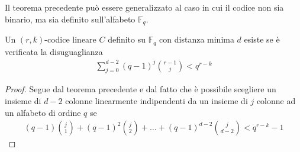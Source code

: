 Il teorema precedente può essere generalizzato al caso in cui il codice non sia binario, ma sia definito sull'alfabeto $\mathbb{F}_{q}$.
\begin{corollario}
   Un $(r,k)$-codice lineare $C$ definito su $\mathbb{F}_{q}$ con distanza minima $d$ esiste se è verificata la disuguaglianza
   \begin{align*}
      \sum_{j=0}^{d-2} (q-1)^{j} \binom{r-1}{j} < q^{r-k}
   \end{align*}
\end{corollario}
\begin{proof}
   Segue dal teorema precedente e dal fatto che è possibile scegliere un insieme di $d-2$ colonne linearmente indipendenti da un insieme di $j$ colonne ad un alfabeto di ordine $q$ se
   \begin{align*}
      (q-1)\binom{j}{1} + (q-1)^{2} \binom{j}{2}+ \dots + (q-1)^{d-2} \binom{j}{d-2}
      <
      q^{r-k} - 1
   \end{align*}
\end{proof}




